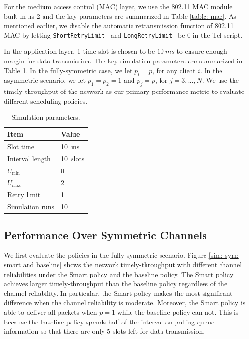 \documentclass{article}
\begin{document}
For the medium access control (MAC) layer, we use the 802.11 MAC module built in ns-2 and the key parameters are summarized in Table \ref{table: mac}. As mentioned earlier, we disable the automatic retransmission function of 802.11 MAC by letting \lstinline|ShortRetryLimit_| and \lstinline|LongRetryLimit_| be 0 in the Tcl script.

In the application layer, 1 time slot is chosen to be $\SI{10}{ms}$ to ensure enough margin for data transmission. The key simulation parameters are summarized in Table \ref{table: parameter}. In the fully-symmetric case, we let $p_i = p$, for any client $i$. In the asymmetric scenario, we let $p_1 = p_2 = 1$ and $p_j = p$, for $j = 3, ..., N$. We use the timely-throughput of the network as our primary performance metric to evaluate different scheduling policies.
\begin{table}[htbp]
\centering
    \caption{Simulation parameters.}
    \vspace{2mm}
    \begin{tabular}{ | l | l | }
    \hline
    Item & Value \\ \hline
    Slot time & \SI{10}{ms}  \\ \hline
    Interval length & \SI{10}{slots} \\ \hline
    $U_{\min}$ & 0 \\ \hline
    $U_{\max}$ & 2 \\ \hline
    Retry limit & 1 \\ \hline
    Simulation runs & 10 \\
    \hline
\end{tabular}
\label{table: parameter}
\end{table}


\subsection{Performance Over Symmetric Channels}
We first evaluate the policies in the fully-symmetric scenario. Figure \ref{sim: sym: smart and baseline} shows the network timely-throughput with different channel reliabilities under the Smart policy and the baseline policy. The Smart policy achieves larger timely-throughput than the baseline policy regardless of the channel reliability. In particular, the Smart policy makes the most significant difference when the channel reliability is moderate. Moreover, the Smart policy is able to deliver all packets when $p=1$ while the baseline policy can not. This is because the baseline policy spends half of the interval on polling queue information so that there are only 5 slots left for data transmission. 
\end{document}
